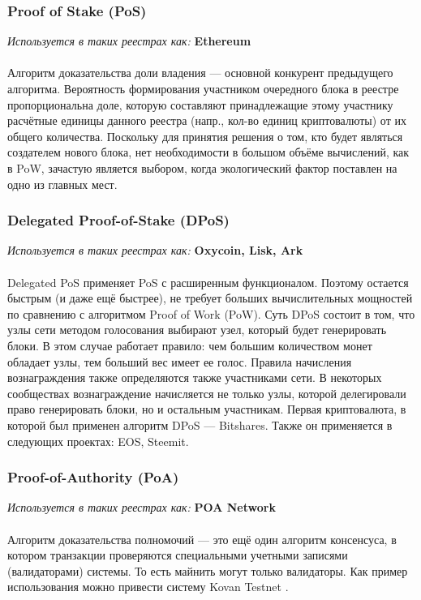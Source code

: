 \subsubsection{Proof of Stake (PoS)}
\emph{Используется в таких реестрах как: } \textbf{Ethereum} \\\\
Алгоритм доказательства доли владения --- основной конкурент предыдущего
алгоритма. Вероятность формирования участником очередного блока в реестре
пропорциональна доле, которую составляют принадлежащие этому участнику
расчётные единицы данного реестра (напр., кол-во единиц криптовалюты) от их
общего количества. Поскольку для принятия решения о том, кто будет являться
создателем нового блока, нет необходимости в большом объёме вычислений, как в
PoW, зачастую является выбором, когда экологический фактор поставлен на одно из
главных мест.

\subsubsection{Delegated Proof-of-Stake (DPoS)}
\emph{Используется в таких реестрах как: } \textbf{Oxycoin, Lisk, Ark} \\\\
Delegated PoS применяет PoS с расширенным функционалом. Поэтому остается
быстрым (и даже ещё быстрее), не требует больших вычислительных мощностей по
сравнению с алгоритмом Proof of Work (PoW). Суть DPoS состоит в том, что узлы
сети методом голосования выбирают узел, который будет генерировать блоки. В
этом случае работает правило: чем большим количеством монет обладает узлы, тем
больший вес имеет ее голос. Правила начисления вознаграждения также
определяются также участниками сети. В некоторых сообществах вознаграждение
начисляется не только узлы, которой делегировали право генерировать блоки, но и
остальным участникам. Первая криптовалюта, в которой был применен алгоритм DPoS
--- Bitshares. Также он применяется в следующих проектах: EOS, Steemit.

\subsubsection{Proof-of-Authority (PoA)}
\emph{Используется в таких реестрах как: } \textbf{POA Network} \\\\
Алгоритм доказательства полномочий --- это ещё один алгоритм консенсуса, в
котором транзакции проверяются специальными учетными записями (валидаторами)
системы. То есть майнить могут только валидаторы. Как пример использования
можно привести систему Kovan Testnet \cite{Etherium2018}.

